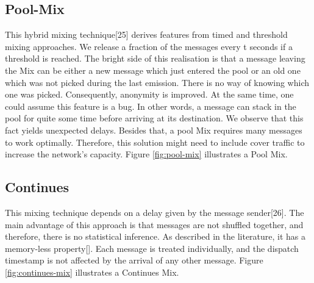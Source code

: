 \documentclass[logo,msc,cyber]{infthesis}   %
\begin{document}
\subsection{Pool-Mix}
This hybrid mixing technique[25] derives features from timed and threshold
mixing approaches. We release a fraction of the messages every t seconds if a
threshold is reached. The bright side of this realisation is that a message
leaving the Mix can be either a new message which just entered the pool or an
old one which was not picked during the last emission. There is no way of
knowing which one was picked. Consequently, anonymity is improved. At the same
time, one could assume this feature is a bug. In other words, a message can
stack in the pool for quite some time before arriving at its destination. We
observe that this fact yields unexpected delays. Besides that, a pool Mix
requires many messages to work optimally. Therefore, this solution might need to
include cover traffic to increase the network's capacity. Figure
\ref{fig:pool-mix} illustrates a Pool Mix.

\subsection{Continues}
This mixing technique depends on a delay given by the message sender[26]. The
main advantage of this approach is that messages are not shuffled together, and
therefore, there is no statistical inference. As described in the literature, it
has a memory-less property[]. Each message is treated individually, and the
dispatch timestamp is not affected by the arrival of any other message. Figure
\ref{fig:continues-mix} illustrates a Continues Mix.
\end{document}
